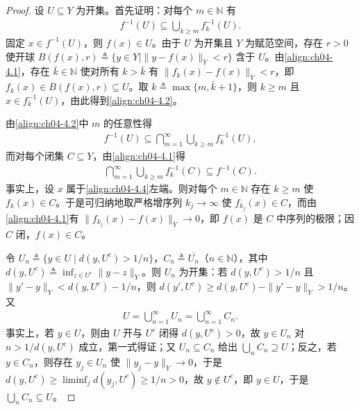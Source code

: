 \documentclass[../../main.tex]{subfiles}%
\begin{document}
\begin{proof}
设 $U\subseteq Y$ 为开集。首先证明：对每个 $m\in\mathbb{N}$ 有
\begin{align}
f^{-1}(U)\subseteq\bigcup_{k\geqslant m}f_k^{-1}(U). \label{align:ch04-4.2}
\end{align}
固定 $x\in f^{-1}(U)$，则 $f(x)\in U$。由于 $U$ 为开集且 $Y$ 为赋范空间，存在 $r>0$ 使开球 $B(f(x),r)\triangleq\{y\in Y\mid\|y-f(x)\|_Y<r\}$ 含于 $U$。由\eqref{align:ch04-4.1}，存在 $\bar k\in\mathbb{N}$ 使对所有 $k>\bar k$ 有 $\|f_k(x)-f(x)\|_Y<r$，即 $f_k(x)\in B(f(x),r)\subseteq U$。取 $k\triangleq\max\{m,\bar k+1\}$，则 $k\geqslant m$ 且 $x\in f_k^{-1}(U)$，由此得到\eqref{align:ch04-4.2}。

由\eqref{align:ch04-4.2}中 $m$ 的任意性得
\begin{align}
f^{-1}(U)\subseteq\bigcap_{m=1}^{\infty}\bigcup_{k\geqslant m}f_k^{-1}(U), \label{align:ch04-4.3}
\end{align}
而对每个闭集 $C\subseteq Y$，由\eqref{align:ch04-4.1}得
\begin{align}
\bigcap_{m=1}^{\infty}\bigcup_{k\geqslant m}f_k^{-1}(C)\subseteq f^{-1}(C). \label{align:ch04-4.4}
\end{align}
事实上，设 $x$ 属于\eqref{align:ch04-4.4}左端。则对每个 $m\in\mathbb{N}$ 存在 $k\geqslant m$ 使 $f_k(x)\in C$。于是可归纳地取严格增序列 $k_j\to\infty$ 使 $f_{k_j}(x)\in C$，而由\eqref{align:ch04-4.1}有 $\|f_{k_j}(x)-f(x)\|_Y\to0$，即 $f(x)$ 是 $C$ 中序列的极限；因 $C$ 闭，$f(x)\in C$。

令 $U_n\triangleq \{y\in U\mid d(y,U^c)>1/n\}$，$C_n\triangleq \overline{U_n}$（$n\in\mathbb{N}$），其中 $d(y,U^c)\triangleq\inf_{z\in U^c}\|y-z\|_Y$。则 $U_n$ 为开集：若 $d(y,U^c)>1/n$ 且 $\|y'-y\|_Y<d(y,U^c)-1/n$，则 $d(y',U^c)\geqslant d(y,U^c)-\|y'-y\|_Y>1/n$。又
\begin{align*}
U=\bigcup_{n=1}^\infty U_n=\bigcup_{n=1}^\infty C_n.
\end{align*}
事实上，若 $y\in U$，则由 $U$ 开与 $U^c$ 闭得 $d(y,U^c)>0$，故 $y\in U_n$ 对 $n>1/d(y,U^c)$ 成立，第一式得证；又 $U_n\subseteq C_n$ 给出 $\bigcup_nC_n\supseteq U$；反之，若 $y\in C_n$，则存在 $y_j\in U_n$ 使 $\|y_j-y\|_Y\to0$，于是 $d(y,U^c)\geqslant\liminf_jd(y_j,U^c)\geqslant1/n>0$，故 $y\notin U^c$，即 $y\in U$，于是 $\bigcup_nC_n\subseteq U$。


\end{proof}
\end{document}
